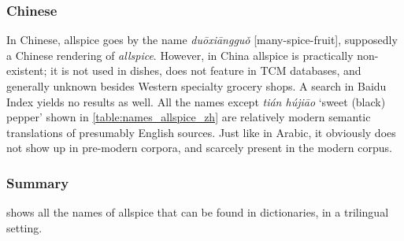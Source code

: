 

\subsubsection{Chinese}



In Chinese, allspice goes by the name  \textit{duōxiāngguǒ} [many-spice-fruit], supposedly a Chinese rendering of \textit{allspice}. However, in China allspice is practically non-existent; it is not used in dishes, does not feature in \gls{TCM} databases, and generally unknown besides Western specialty grocery shops. A search in Baidu Index yields no results as well. All the names except  \textit{tián hújiāo} `sweet (black) pepper' shown in \cref{table:names_allspice_zh} are relatively modern semantic translations of presumably English sources. Just like in Arabic, it obviously does not show up in pre-modern corpora, and scarcely present in the modern corpus.



\subsubsection{Summary}

 shows all the names of allspice that can be found in dictionaries, in a trilingual setting.












